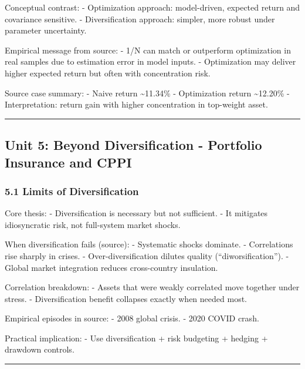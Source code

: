 \documentclass[
]{article}
\begin{document}
Conceptual contrast: - Optimization approach: model-driven, expected
return and covariance sensitive. - Diversification approach: simpler,
more robust under parameter uncertainty.

Empirical message from source: - 1/N can match or outperform
optimization in real samples due to estimation error in model inputs. -
Optimization may deliver higher expected return but often with
concentration risk.

Source case summary: - Naive return \textasciitilde11.34\% -
Optimization return \textasciitilde12.20\% - Interpretation: return gain
with higher concentration in top-weight asset.

\begin{center}\rule{0.5\linewidth}{0.5pt}\end{center}

\hypertarget{unit-5-beyond-diversification---portfolio-insurance-and-cppi}{%
\subsection{Unit 5: Beyond Diversification - Portfolio Insurance and
CPPI}\label{unit-5-beyond-diversification---portfolio-insurance-and-cppi}}

\hypertarget{limits-of-diversification}{%
\subsubsection{5.1 Limits of
Diversification}\label{limits-of-diversification}}

Core thesis: - Diversification is necessary but not sufficient. - It
mitigates idiosyncratic risk, not full-system market shocks.

When diversification fails (source): - Systematic shocks dominate. -
Correlations rise sharply in crises. - Over-diversification dilutes
quality (``diworsification''). - Global market integration reduces
cross-country insulation.

Correlation breakdown: - Assets that were weakly correlated move
together under stress. - Diversification benefit collapses exactly when
needed most.

Empirical episodes in source: - 2008 global crisis. - 2020 COVID crash.

Practical implication: - Use diversification + risk budgeting + hedging
+ drawdown controls.

\begin{center}\rule{0.5\linewidth}{0.5pt}\end{center}
\end{document}
